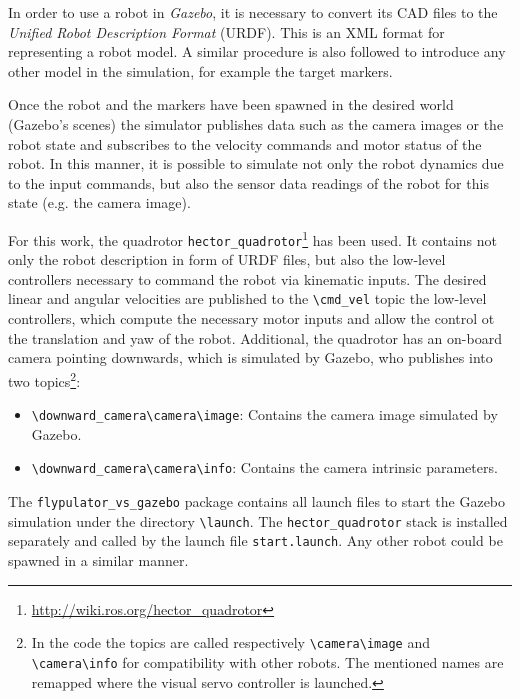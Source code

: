 In order to use a robot in \emph{Gazebo}, it is necessary to convert its CAD files to the \emph{Unified Robot Description Format} (URDF). This is an XML format for representing a robot model. A similar procedure is also followed to introduce any other model in the simulation, for example the target markers.


Once the robot and the markers have been spawned in the desired world (Gazebo's scenes) the simulator publishes data such as the camera images or the robot state and subscribes to the velocity commands and motor status of the robot. In this manner, it is possible to simulate not only the robot dynamics due to the input commands, but also the sensor data readings of the robot for this state (e.g. the camera image).

For this work, the quadrotor \texttt{hector\_quadrotor}\footnote{\url{http://wiki.ros.org/hector_quadrotor}} has been used. It contains not only the robot description in form of URDF files, but also the low-level controllers necessary to command the robot via kinematic inputs. The desired linear and angular velocities are published to the \texttt{\textbackslash cmd\_vel} topic the low-level controllers, which compute the necessary motor inputs and allow the control ot the translation and yaw of the robot. Additional, the quadrotor has an on-board camera pointing downwards, which is simulated by Gazebo, who publishes into two topics\footnote{In the code the topics are called respectively \texttt{\textbackslash camera\textbackslash image} and \texttt{\textbackslash camera\textbackslash info} for compatibility with other robots. The mentioned names are remapped where the visual servo controller is launched.}:

\begin{itemize}
	\item \texttt{\textbackslash downward\_camera\textbackslash camera\textbackslash image}: Contains the camera image simulated by Gazebo.
	
	\item \texttt{\textbackslash downward\_camera\textbackslash camera\textbackslash info}: Contains the camera intrinsic parameters.
\end{itemize}

The \texttt{flypulator\_vs\_gazebo} package contains all launch files to start the Gazebo simulation under the directory \texttt{\textbackslash launch}. The \texttt{hector\_quadrotor} stack is installed separately and called by the launch file \texttt{start.launch}. Any other robot could be spawned in a similar manner.

